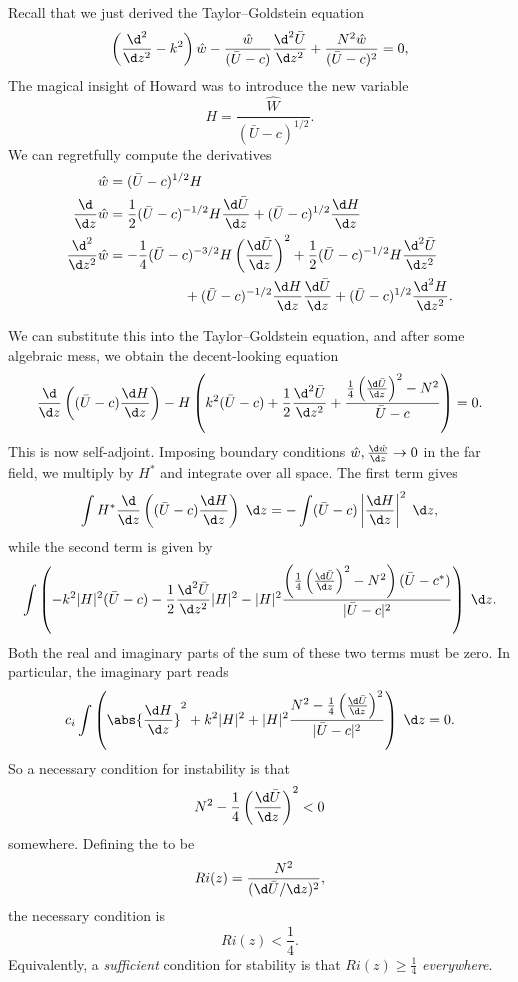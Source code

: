 \documentclass[a4paper]{article}
\begin{document}
Recall that we just derived the Taylor--Goldstein equation
\[
  \left(\frac{\d^2}{\d z^2} - k^2\right) \hat{w} - \frac{\hat{w}}{(\bar{U} - c)} \frac{\d^2 \bar{U}}{\d z^2} + \frac{N^2 \hat{w}}{(\bar{U} - c)^2} = 0,
\]
The magical insight of Howard was to introduce the new variable
\[
  H = \frac{\hat{W}}{(\bar{U} - c)^{1/2}}.
\]
We can regretfully compute the derivatives
\begin{align*}
  \hat{w} &= (\bar{U} - c)^{1/2} H\\
  \frac{\d}{\d z} \hat{w} &= \frac{1}{2}(\bar{U} - c)^{-1/2} H \frac{\d \bar{U}}{\d z} + (\bar{U} - c)^{1/2} \frac{\d H}{\d z}\\
  \frac{\d^2}{\d z^2} \hat{w} &= - \frac{1}{4} (\bar{U} - c)^{-3/2} H \left(\frac{\d \bar{U}}{\d z}\right)^2 + \frac{1}{2} (\bar{U} - c)^{-1/2} H \frac{\d^2 \bar{U}}{\d z^2} \\
  &\hphantom{{}={}asdfadsf} + (\bar{U} - c)^{-1/2} \frac{\d H}{\d z} \frac{\d \bar{U}}{\d z} + (\bar{U} - c)^{1/2} \frac{\d^2 H}{\d z^2}.
\end{align*}

We can substitute this into the Taylor--Goldstein equation, and after some algebraic mess, we obtain the decent-looking equation
\[
  \frac{\d}{\d z}\left((\bar{U} - c) \frac{\d H}{\d z}\right) - H \left(k^2 (\bar{U} - c) + \frac{1}{2} \frac{\d^2 \bar{U}}{\d z^2} + \frac{\frac{1}{4} \left(\frac{\d \bar{U}}{\d z}\right)^2 - N^2}{\bar{U} - c}\right) = 0.
\]
This is now self-adjoint. Imposing boundary conditions $\hat{w}, \frac{\d \hat{w}}{\d z} \to 0$ in the far field, we multiply by $H^*$ and integrate over all space. The first term gives
\[
  \int H^* \frac{\d}{\d z} \left((\bar{U} - c)\frac{\d H}{\d z}\right)\;\d z = -\int (\bar{U} - c) \left|\frac{\d H}{\d z}\right|^2 \;\d z,
\]
while the second term is given by
\[
  \int \left(-k^2 |H|^2 (\bar{U} - c) - \frac{1}{2} \frac{\d^2\bar{U}}{\d z^2} |H|^2 - |H|^2 \frac{\left(\frac{1}{4} \left(\frac{\d \bar{U}}{\d z}\right)^2 - N^2\right) (\bar{U} - c^*)}{|\bar{U} - c|^2}\right)\;\d z.
\]
Both the real and imaginary parts of the sum of these two terms must be zero. In particular, the imaginary part reads
\[
  c_i \int \left(\abs{\frac{\d H}{\d z}}^2 + k^2 |H|^2 + |H|^2 \frac{N^2 - \frac{1}{4} \left(\frac{\d \bar{U}}{\d z}\right)^2}{|\bar{U} - c|^2}\right)\;\d z = 0.
\]
So a necessary condition for instability is that
\[
  N^2 - \frac{1}{4} \left(\frac{\d \bar{U}}{\d z}\right)^2 < 0
\]
somewhere. Defining the  to be
\[
  Ri(z) = \frac{N^2}{(\d \bar{U}/\d z)^2},
\]
the necessary condition is
\[
  Ri(z) < \frac{1}{4}.
\]
Equivalently, a \emph{sufficient} condition for stability is that $Ri(z) \geq \frac{1}{4}$ \emph{everywhere}.
\end{document}

